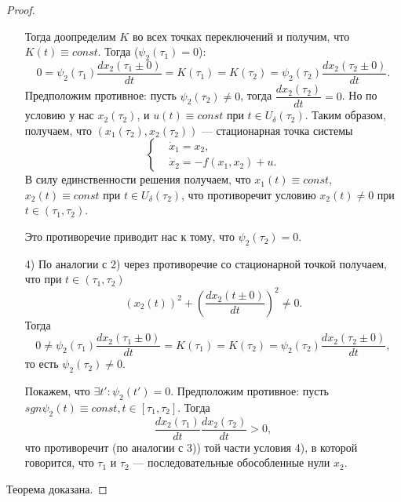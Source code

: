 \documentclass[12pt, a4paper]{article}
\theoremstyle{rusdef}
\begin{document}
\begin{proof}
\begin{enumerate}
    Тогда доопределим $K$ во всех точках переключений и получим, что $K(t) \equiv const$.
    Тогда ($\psi_2(\tau_1) = 0$):
    $$
      0 = \psi_2(\tau_1) \dfrac{dx_2(\tau_1 \pm 0)}{dt} = K(\tau_1) = K(\tau_2) = \psi_2(\tau_2) \dfrac{dx_2(\tau_2 \pm 0)}{dt}.
    $$
    Предположим противное: пусть $\psi_2(\tau_2) \neq 0$, тогда $\dfrac{dx_2(\tau_2)}{dt} = 0$. Но по условию у нас $x_2(\tau_2)$, и $u(t) \equiv const$ при $t \in U_{\delta}(\tau_2)$. Таким образом, получаем, что $(x_1(\tau_2), x_2(\tau_2))$ --- стационарная точка системы
    $$
      \left\{
        \begin{aligned}
          & \dot{x}_1 = x_2, \\
          & \dot{x}_2 = -f(x_1, x_2) + u.
        \end{aligned}
      \right.
    $$
    В силу единственности решения получаем, что $x_1(t) \equiv const$, $x_2(t) \equiv const$ при $t \in U_{\delta}(\tau_2)$, что противоречит условию $x_2(t) \neq 0$ при $t \in (\tau_1, \tau_2)$.

    Это противоречие приводит нас к тому, что $\psi_2(\tau_2) = 0$.
    \item[4)] По аналогии с 2) через противоречие со стационарной точкой получаем, что при $t \in (\tau_1, \tau_2)$
    $$
        (x_2(t))^2 + \left( \dfrac{dx_2(t \pm 0)}{dt} \right)^2 \neq 0.
    $$
    Тогда 
    $$
      0 \neq \psi_2(\tau_1) \dfrac{dx_2(\tau_1 \pm 0)}{dt} = K(\tau_1) = K(\tau_2) = \psi_2(\tau_2) \dfrac{dx_2(\tau_2 \pm 0)}{dt},
    $$
    то есть $\psi_2(\tau_2) \neq 0$.

    Покажем, что $\exists t' \colon \psi_2(t') = 0$. Предположим противное: пусть $sgn \psi_2(t) \equiv const, t \in [\tau_1, \tau_2]$. Тогда
    $$
        \dfrac{dx_2(\tau_1)}{dt} \dfrac{dx_2(\tau_2)}{dt} > 0,
    $$
    что противоречит (по аналогии с 3)) той части условия 4), в которой говорится, что $\tau_1$ и $\tau_2$ --- последовательные обособленные нули $x_2$.
  \end{enumerate}
  Теорема доказана.
\end{proof}
\end{document}
